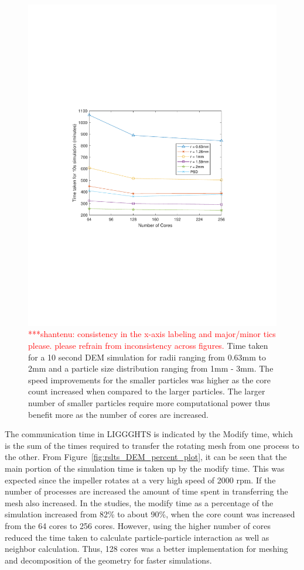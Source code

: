 \documentclass[preprint,11pt,authoryear]{elsarticle}
\newcommand{\jhanote}[1]{ {\textcolor{red} { ***shantenu: #1 }}}
\newcommand{\jhanote}[1]{ {\textcolor{red} { ***shantenu: #1 }}}
\begin{document}
\begin{figure}
\centering
\includegraphics[scale=0.7]{rslsts_DEM_alldia_timing_mtlb.pdf}
\caption{ \jhanote{consistency in the x-axis labeling and major/minor tics please. please refrain from inconsistency across figures.}
Time taken for a 10 second DEM simulation for radii ranging from
 0.63mm to 2mm and a particle size distribution ranging from 1mm - 3mm. The speed improvements 
 for the smaller particles was higher as the core count increased when compared to the larger particles. 
 The larger number of smaller particles require more computational power thus benefit more as the number 
 of cores are increased. }
\label{fig:rslts_DEM_timing_studies}
\end{figure}

The communication time in LIGGGHTS is indicated by the Modify time, which is the sum of the 
times required to transfer the rotating mesh from one process to the other. From Figure~\ref{fig:rslts_DEM_percent_plot}, it can be seen that the main portion of the simulation time is taken up by 
the modify time. This was expected since the impeller rotates at a very high speed of 2000 rpm. If 
the number of processes are increased the amount of time spent in transferring the mesh also 
increased. In the studies, the modify time as a percentage of the simulation increased from 82\% to 
about 90\%, when the core count was increased from the 64 cores to 256 cores. However, using the 
higher number of cores reduced the time taken to calculate particle-particle interaction as well as  
neighbor calculation. Thus, 128 cores was a better implementation for meshing and decomposition of the 
geometry for faster simulations.
\end{document}
